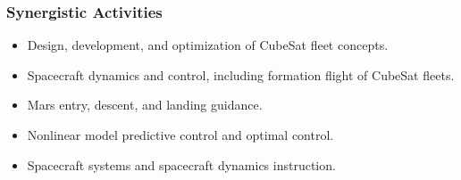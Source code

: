 \subsubsection{Synergistic Activities}

\begin{itemize}
  \item Design, development, and optimization of CubeSat fleet concepts.
  \item Spacecraft dynamics and control, including formation flight of CubeSat fleets.
  \item Mars entry, descent, and landing guidance.
  \item Nonlinear model predictive control and optimal control.
  \item Spacecraft systems and spacecraft dynamics instruction.
\end{itemize}
